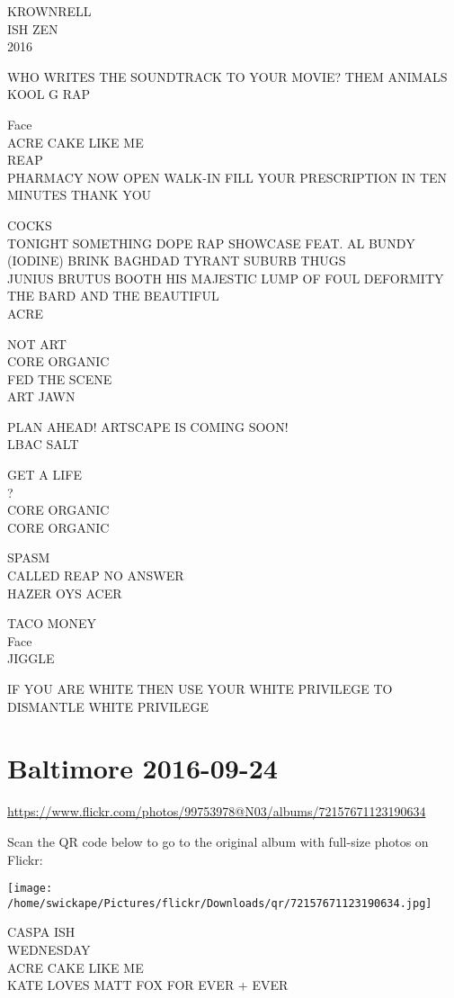 \documentclass[10pt,letterpaper]{article}
\begin{document}
KROWNRELL\\
ISH ZEN\\
2016

WHO WRITES THE SOUNDTRACK TO YOUR MOVIE?  THEM ANIMALS\\
KOOL G RAP

Face\\
ACRE CAKE LIKE ME\\
REAP\\
PHARMACY NOW OPEN WALK{-}IN FILL YOUR PRESCRIPTION IN TEN MINUTES THANK YOU

COCKS\\
TONIGHT SOMETHING DOPE RAP SHOWCASE FEAT. AL BUNDY (IODINE) BRINK BAGHDAD TYRANT SUBURB THUGS\\
JUNIUS BRUTUS BOOTH HIS MAJESTIC LUMP OF FOUL DEFORMITY THE BARD AND THE BEAUTIFUL\\
ACRE

NOT ART\\
CORE ORGANIC\\
FED THE SCENE\\
ART JAWN

PLAN AHEAD!  ARTSCAPE IS COMING SOON!\\
LBAC SALT

GET A LIFE\\
?\\
CORE ORGANIC\\
CORE ORGANIC

SPASM\\
CALLED REAP NO ANSWER\\
HAZER OYS ACER

TACO MONEY\\
Face\\
JIGGLE

IF YOU ARE WHITE THEN USE YOUR WHITE PRIVILEGE TO DISMANTLE WHITE PRIVILEGE


\section*{Baltimore 2016-09-24}

\url{https://www.flickr.com/photos/99753978@N03/albums/72157671123190634}

Scan the QR code below to go to the original album with full-size photos on Flickr:

\texttt{[image: /home/swickape/Pictures/flickr/Downloads/qr/72157671123190634.jpg]}


CASPA ISH\\
WEDNESDAY\\
ACRE CAKE LIKE ME\\
KATE LOVES MATT FOX FOR EVER + EVER
\end{document}
